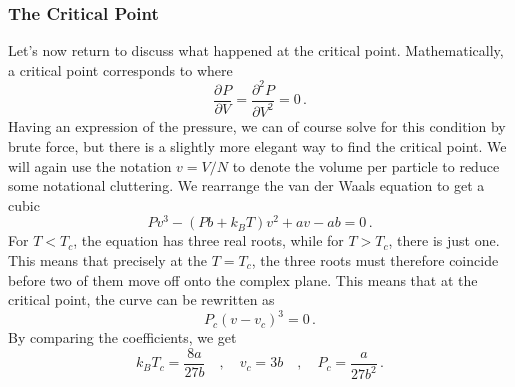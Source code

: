 \documentclass{article}
\theoremstyle{plain}\theoremheaderfont{\normalfont\bfseries}\theorembodyfont{\rmfamily}\theoremseparator{.}\newtheorem*{thm}{Theorem}\newtheorem*{law}{Law}\newtheorem*{pos}{Postulate}
\numberwithin{equation}{section}
\newcommand{\pdv}[3][]{\frac{\partial^{#1} #2}{{\partial #3}^{#1}}}
\begin{document}
    \subsubsection{The Critical Point}
    Let's now return to discuss what happened at the critical point. Mathematically, a critical point corresponds to where
    \begin{equation}
        \pdv{P}{V}=\pdv[2]{P}{V}=0\,.
    \end{equation}
    Having an expression of the pressure, we can of course solve for this condition by brute force, but there is a slightly more elegant way to find the critical point. We will again use the notation \(v=V/N\) to denote the volume per particle to reduce some notational cluttering. We rearrange the van der Waals equation to get a cubic
    \begin{equation}
        Pv^3-(Pb+k_B T)v^2+av-ab=0\,.
    \end{equation}
    For \(T<T_c\), the equation has three real roots, while for \(T>T_c\), there is just one. This means that precisely at the \(T=T_c\), the three roots must therefore coincide before two of them move off onto the complex plane. This means that at the critical point, the curve can be rewritten as
    \begin{equation}
        P_c(v-v_c)^3=0\,.
    \end{equation}
    By comparing the coefficients, we get
    \begin{equation}
        k_B T_c=\frac{8a}{27b}\quad,\quad v_c=3b\quad,\quad P_c=\frac{a}{27b^2}\,.
    \end{equation}
\end{document}
